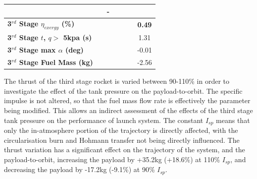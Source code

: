 \begin{table}[ht]
\begin{tabular}{l c c c c c c}
		& \secondFlightTimeTThreeOneHundredTenNoReturn
		& -
		\\
		\hline 
		\textbf{3$^{rd}$ Stage $\eta_{exergy}$ (\%)}
		& \textbf{\thirddExergyEffTThreeNinetyNoReturn}
		& \textbf{\thirddExergyEffTThreeNinetyFiveNoReturn}
		& \textbf{\thirddExergyEffTThreeStandardNoReturn}
		& \textbf{\thirddExergyEffTThreeOneHundredFiveNoReturn}
		& \textbf{\thirddExergyEffTThreeOneHundredTenNoReturn}
		& \textbf{0.49}
		\\
		\textbf{3$^{rd}$ Stage $t$, $q >$ 5kpa (s)}
		& \thirdqOverFiveTThreeNinetyNoReturn
		& \thirdqOverFiveTThreeNinetyFiveNoReturn
		& \thirdqOverFiveTThreeStandardNoReturn
		& \thirdqOverFiveTThreeOneHundredFiveNoReturn
		& \thirdqOverFiveTThreeOneHundredTenNoReturn
		&1.31
		\\
		\textbf{3$^{rd}$ Stage max $\alpha$ (deg)}
		& \thirdmaxAoATThreeNinetyNoReturn
		& \thirdmaxAoATThreeNinetyFiveNoReturn
		& \thirdmaxAoATThreeStandardNoReturn
		& \thirdmaxAoATThreeOneHundredFiveNoReturn
		& \thirdmaxAoATThreeOneHundredTenNoReturn
		&-0.01
		\\
		\textbf{3$^{rd}$ Stage Fuel Mass (kg)}
		& \thirdmFuelTThreeNinetyNoReturn
		& \thirdmFuelTThreeNinetyFiveNoReturn
		& \thirdmFuelTThreeStandardNoReturn
		& \thirdmFuelTThreeOneHundredFiveNoReturn
		& \thirdmFuelTThreeOneHundredTenNoReturn
		&-2.56
		\\
		\hline 
	\end{tabular} 
\end{table}

The thrust of the third stage rocket is varied between 90-110\% in order to investigate the effect of the tank pressure on the payload-to-orbit. The specific impulse is not altered, so that the fuel mass flow rate is effectively the parameter being modified. This allows an indirect assessment of the effects of the third stage tank pressure on the performance of launch system. The constant $I_{sp}$ means that only the in-atmosphere portion of the trajectory is directly affected, with the circularisation burn and Hohmann transfer not being directly influenced. 
The thrust variation has a significant effect on the trajectory of the system, and the payload-to-orbit, increasing the payload by +35.2kg (+18.6\%) at 110\% $I_{sp}$, and decreasing the payload by -17.2kg (-9.1\%) at 90\% $I_{sp}$. 


